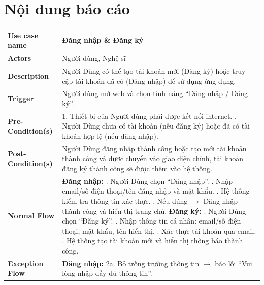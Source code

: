 \documentclass[a4paper]{article}
\begin{document}
\section*{Nội dung báo cáo}

\begin{table}[h!]
\centering
\renewcommand{\arraystretch}{1.3} %
\begin{tabularx}{\textwidth}{|l|X|}
\hline
\textbf{Use case name} & Đăng nhập \& Đăng ký \\ \hline
\textbf{Actors}        & Người dùng, Nghệ sĩ \\ \hline
\textbf{Description}   & Người Dùng có thể tạo tài khoản mới (Đăng ký) hoặc truy cập tài khoản đã có (Đăng nhập) để sử dụng ứng dụng. \\ \hline
\textbf{Trigger}       & Người dùng mở web và chọn tính năng “Đăng nhập / Đăng ký”. \\ \hline
\textbf{Pre-Condition(s)} 
& 1. Thiết bị của Người dùng phải được kết nối internet. \newline
  2. Người Dùng chưa có tài khoản (nếu đăng ký) hoặc đã có tài khoản hợp lệ (nếu đăng nhập). \\ \hline
\textbf{Post-Condition(s)} 
& Người Dùng đăng nhập thành công hoặc tạo mới tài khoản thành công và được chuyển vào giao diện chính, tài khoản đăng ký thành công sẽ được thêm vào hệ thống. \\ \hline
\textbf{Normal Flow}   
& \textbf{Đăng nhập:} \newline
  1. Người Dùng chọn “Đăng nhập”. \newline
  2. Nhập email/số điện thoại/tên đăng nhập và mật khẩu. \newline
  3. Hệ thống kiểm tra thông tin xác thực. \newline
  4. Nếu đúng $\rightarrow$ Đăng nhập thành công và hiển thị trang chủ. \newline
  \textbf{Đăng ký:} \newline
  1. Người Dùng chọn “Đăng ký”. \newline
  2. Nhập thông tin cá nhân: email/số điện thoại, mật khẩu, tên hiển thị. \newline
  3. Xác thực tài khoản qua email. \newline
  4. Hệ thống tạo tài khoản mới và hiển thị thông báo thành công. \\ \hline
\textbf{Exception Flow} 
& \textbf{Đăng nhập:} \newline
  2a. Bỏ trống trường thông tin $\rightarrow$ báo lỗi “Vui lòng nhập đầy đủ thông tin”. \newline

\end{tabularx}
\end{table}
\end{document}
